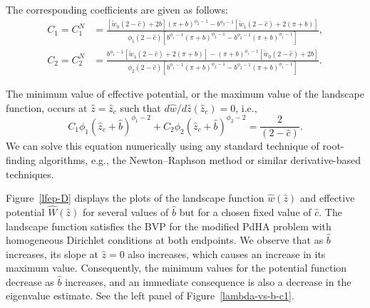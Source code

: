 \documentclass[symmetry,article,accept,moreauthors,pdftex,a4paper]{mdpi}
\begin{document}
\begin{paracol}{2}
\switchcolumn \noindent
The corresponding coefficients are given as follows:
\begin{align*}
C_1 = C_1^{N} &= \frac{\left[\widetilde{w}_0 (2 - \widehat{c}) + 2b \right](\pi + b)^{\phi_2 - 1} - b^{\phi_2 - 1} \left[\widetilde{w}_1(2 - \widehat{c}) + 2(\pi + b)\right]}{\phi_1 (2 - \widehat{c}) \left[ b^{\phi_1 - 1} (\pi + b)^{\phi_2 - 1} - b^{\phi_2 - 1} (\pi + b)^{\phi_1 - 1}\right]}, \\
C_2 = C_2^{N} &= \frac{b^{\phi_1 - 1} \left[\widetilde{w}_1 (2 - \widehat{c}) + 2(\pi + b) \right] - (\pi + b)^{\phi_1 - 1} \left[\widetilde{w}_0 (2 - \widehat{c}) + 2 b \right]}{\phi_2 (2 - \widehat{c}) \left[ b^{\phi_1 - 1} (\pi + b)^{\phi_2 - 1} - b^{\phi_2 - 1} (\pi + b)^{\phi_1 - 1} \right]}.
\end{align*}

The minimum value of effective potential, or the maximum value of the landscape function, occurs at $\widehat{z} = \widehat{z}_c$ such that $d\widehat{w}/d\widehat{z}(\widehat{z}_c) = 0$, i.e.,
\begin{equation*}
C_1 \phi_1 (\widehat{z}_c + \widehat{b})^{\phi_1 - 2} + C_2 \phi_2 (\widehat{z}_c + \widehat{b})^{\phi_2 - 2} = \frac{2}{(2 - \widehat{c})}.
\end{equation*}
We can solve this equation numerically using any standard technique of root-finding algorithms, e.g., the Newton--Raphson method or similar derivative-based techniques.

Figure~\ref{lfep-D} displays the plots of the landscape function $\widehat{w}(\widehat{z})$ and effective potential $\widehat{W}(\widehat{z})$ for several values of $\widehat{b}$ but for a chosen fixed value of $\widehat{c}$. The landscape function satisfies the BVP for the modified PdHA problem with homogeneous Dirichlet conditions at both endpoints. We observe that as $\widehat{b}$ increases, its slope at $\widehat{z} = 0$ also increases, which causes an increase in its maximum value. Consequently, the minimum values for the potential function decrease as $\widehat{b}$ increases, and an immediate consequence is also a decrease in the eigenvalue estimate. See the left panel of Figure~\ref{lambda-vs-b-c1}. 

\end{paracol}
\nointerlineskip
\end{document}

